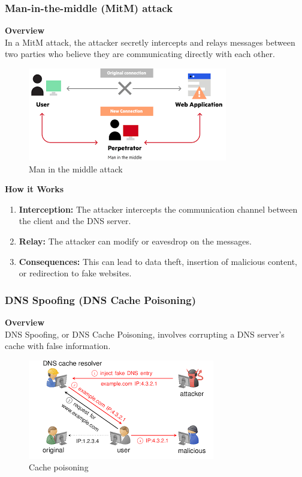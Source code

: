 \subsubsection{Man-in-the-middle (MitM) attack}
\textbf{Overview\\}
In a MitM attack, the attacker secretly intercepts and relays messages between two parties who believe they are communicating directly with each other.\\

\begin{figure}[ht!]
	\centering
	\includegraphics[width=0.5\linewidth]{chap1/images/man in the middle.png}
	\caption{Man in the middle attack \cite{howstuffworks2023dns}}
	\label{fig:enter-label}
\end{figure}


\textbf{How it Works}
\begin{enumerate}
	\item \textbf{Interception:} The attacker intercepts the communication channel between the client and the DNS server.
	\item \textbf{Relay:} The attacker can modify or eavesdrop on the messages.
	\item \textbf{Consequences:} This can lead to data theft, insertion of malicious content, or redirection to fake websites.
\end{enumerate}

\subsubsection{DNS Spoofing (DNS Cache Poisoning)}
\textbf{Overview\\}
DNS Spoofing, or DNS Cache Poisoning, involves corrupting a DNS server's cache with false information.


\begin{figure}[ht!]
	\centering
	\includegraphics[width=0.5\linewidth]{chap1/images/cache poisning.png}
	\caption{Cache poisoning \cite{datadog2023dns}}
	\label{fig:enter-label}
\end{figure}


